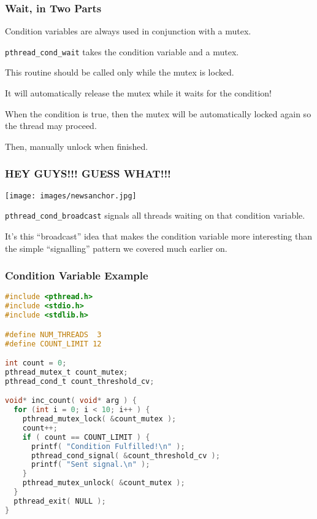 \begin{frame}
	\frametitle{Wait, in Two Parts}

	Condition variables are always used in conjunction with a mutex.

	\texttt{pthread\_cond\_wait} takes the condition variable and a mutex.

	This routine should be called only while the mutex is locked.

	It will automatically release the mutex while it waits for the condition!

	When the condition is true, then the mutex will be automatically locked again so the thread may proceed.

	Then, manually unlock when finished.

\end{frame}

\begin{frame}
	\frametitle{HEY GUYS!!! GUESS WHAT!!!}
	\begin{center}
		\texttt{[image: images/newsanchor.jpg]}
	\end{center}

	\texttt{pthread\_cond\_broadcast} signals all threads waiting on that condition variable.

	It's this ``broadcast'' idea that makes the condition variable more interesting than the simple ``signalling'' pattern we covered much earlier on.

\end{frame}

\begin{frame}[fragile]
	\frametitle{Condition Variable Example}

	\begin{lstlisting}[language=C]
#include <pthread.h>
#include <stdio.h>
#include <stdlib.h>

#define NUM_THREADS  3
#define COUNT_LIMIT 12

int count = 0;
pthread_mutex_t count_mutex;
pthread_cond_t count_threshold_cv;

void* inc_count( void* arg ) {
  for (int i = 0; i < 10; i++ ) {
    pthread_mutex_lock( &count_mutex );
    count++;
    if ( count == COUNT_LIMIT ) {
      printf( "Condition Fulfilled!\n" );
      pthread_cond_signal( &count_threshold_cv );
      printf( "Sent signal.\n" );
    }
    pthread_mutex_unlock( &count_mutex );
  }
  pthread_exit( NULL );
}
\end{lstlisting}
\end{frame}

